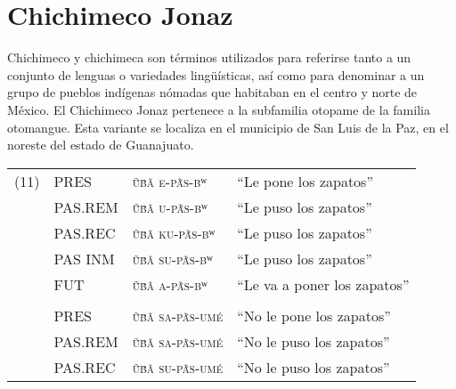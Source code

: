 \section*{Chichimeco Jonaz}

\noindent Chichimeco y chichimeca son términos utilizados para referirse tanto a un conjunto de lenguas o variedades lingüísticas, así como para denominar a un grupo de pueblos indígenas nómadas que habitaban en el centro y norte de México. El Chichimeco Jonaz pertenece a la subfamilia otopame de la familia otomangue. Esta variante se localiza en el municipio de San Luis de la Paz, en el noreste del estado de Guanajuato. \vspace{0.25cm}

{\setmainfont{Doulos SIL}
    \begin{tabular}{rlrr}
        \multicolumn{1}{l}{(11)} & PRES       & \multicolumn{1}{l}{\textsc{ṹβ̃ã e-pã́s-βʷ}}           & \multicolumn{1}{l}{“Le pone los zapatos”}          \\
                                 & PAS.REM    & \multicolumn{1}{l}{\textsc{ṹβ̃ã u-pã́s-βʷ}}           & \multicolumn{1}{l}{“Le puso los zapatos”}          \\
                                 & PAS.REC    & \multicolumn{1}{l}{\textsc{ṹβ̃ã ku-pã́s-βʷ}}          & \multicolumn{1}{l}{“Le puso los zapatos”}          \\
                                 & PAS INM    & \multicolumn{1}{l}{\textsc{ṹβ̃ã su-pã́s-βʷ}}          & \multicolumn{1}{l}{“Le puso los zapatos”}          \\
                                 & FUT        & \multicolumn{1}{l}{\textsc{ṹβ̃ã a-pã́s-βʷ}}           & \multicolumn{1}{l}{“Le va a poner los zapatos”}    \\
                                 &            &                                                     &                                                    \\
                                 & PRES       & \multicolumn{1}{l}{\textsc{ṹβ̃ã sa-pã́s-umé}}         & \multicolumn{1}{l}{“No le pone los zapatos”}       \\
                                 & PAS.REM    & \multicolumn{1}{l}{\textsc{ṹβ̃ã sa-pã́s-umé}}         & \multicolumn{1}{l}{“No le puso los zapatos”}       \\
                                 & PAS.REC    & \multicolumn{1}{l}{\textsc{ṹβ̃ã su-pã́s-umé}}         & \multicolumn{1}{l}{“No le puso los zapatos”}       \\

\end{tabular}}

